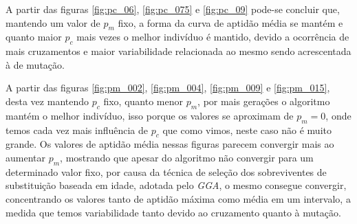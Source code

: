 \documentclass[12pt]{elsarticle}
\begin{document}
	A partir das figuras \ref{fig:pc_06}, \ref{fig:pc_075} e \ref{fig:pc_09} pode-se concluir que, mantendo um valor de $p_m$ fixo, a forma da curva de aptidão média se mantém e quanto maior $p_c$ mais vezes o melhor indivíduo é mantido, devido a ocorrência de mais cruzamentos e maior variabilidade relacionada ao mesmo sendo acrescentada à de mutação.
	
	A partir das figuras \ref{fig:pm_002}, \ref{fig:pm_004}, \ref{fig:pm_009} e \ref{fig:pm_015}, desta vez mantendo $p_c$ fixo, quanto menor $p_m$, por mais gerações o algoritmo mantém o melhor indivíduo, isso porque os valores se aproximam de $p_m = 0$, onde temos cada vez mais influência de $p_c$ que como vimos, neste caso não é muito grande.
	Os valores de aptidão média nessas figuras parecem convergir mais ao aumentar $p_m$, mostrando que apesar do algoritmo não convergir para um determinado valor fixo, por causa da técnica de seleção dos sobreviventes de substituição baseada em idade, adotada pelo \emph{GGA}, o mesmo consegue convergir, concentrando os valores tanto de aptidão máxima como média em um intervalo, a medida que temos variabilidade tanto devido ao cruzamento quanto à mutação.
\end{document}
